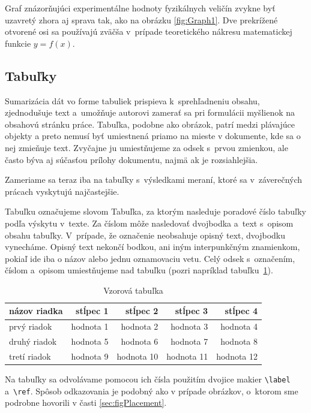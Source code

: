 Graf znázorňujúci experimentálne hodnoty fyzikálnych veličín
zvykne byť uzavretý zhora aj sprava tak,
ako na obrázku \ref{fig:Graph1}.
Dve prekrížené otvorené osi sa používajú zväčša
v~prípade teoretického nákresu matematickej funkcie $y = f(x)$.

\subsection{Tabuľky}
Sumarizácia dát vo forme tabuliek prispieva
k~sprehľadneniu obsahu, zjednodušuje text
a~umožňuje autorovi zamerať sa pri formulácii myšlienok na
obsahovú stránku práce.
Tabuľka, podobne ako obrázok, patrí medzi plávajúce objekty
a preto nemusí byť umiestnená priamo na mieste v dokumente,
kde sa o nej zmieňuje text.
Zvyčajne ju umiestňujeme za odsek s~prvou zmienkou,
ale často býva aj súčasťou prílohy dokumentu,
najmä ak je rozsiahlejšia.

Zameriame sa teraz iba na tabuľky s~výsledkami meraní,
ktoré sa v~záverečných prácach vyskytujú najčastejšie.

Tabuľku označujeme slovom Tabuľka,
za ktorým nasleduje poradové číslo tabuľky podľa výskytu
v~texte.
Za číslom môže nasledovať dvojbodka a~text s~opisom obsahu
tabuľky.
V~prípade, že označenie neobsahuje opisný text,
dvojbodku vynecháme.
Opisný text nekončí bodkou,
ani iným interpunkčným znamienkom,
pokiaľ ide iba o názov alebo jednu oznamovaciu vetu.
Celý odsek s~označením, číslom a~opisom umiestňujeme
nad tabuľku (pozri napríklad tabuľku~\ref{tab:template}).

\begin{table}[!ht]
  \caption{Vzorová tabuľka}
  \label{tab:template}
  \centering
  \begin{tabular}{@{}lrrrr@{}}
    \toprule
    \textbf{názov riadka} & \textbf{stĺpec 1} & \textbf{stĺpec 2} & \textbf{stĺpec 3} & \textbf{stĺpec 4} \\
    \midrule
    prvý riadok & hodnota 1 & hodnota 2 & hodnota 3 & hodnota 4\\
    druhý riadok & hodnota 5 & hodnota 6 & hodnota 7 & hodnota 8\\
    tretí riadok & hodnota 9 & hodnota 10 & hodnota 11 & hodnota 12\\
    \bottomrule
  \end{tabular}
\end{table}

Na tabuľky sa odvolávame pomocou ich čísla použitím dvojice makier
\verb|\label| a~\verb|\ref|.
Spôsob odkazovania je podobný ako v prípade obrázkov,
o~ktorom sme podrobne hovorili v časti \ref{sec:figPlacement}.

